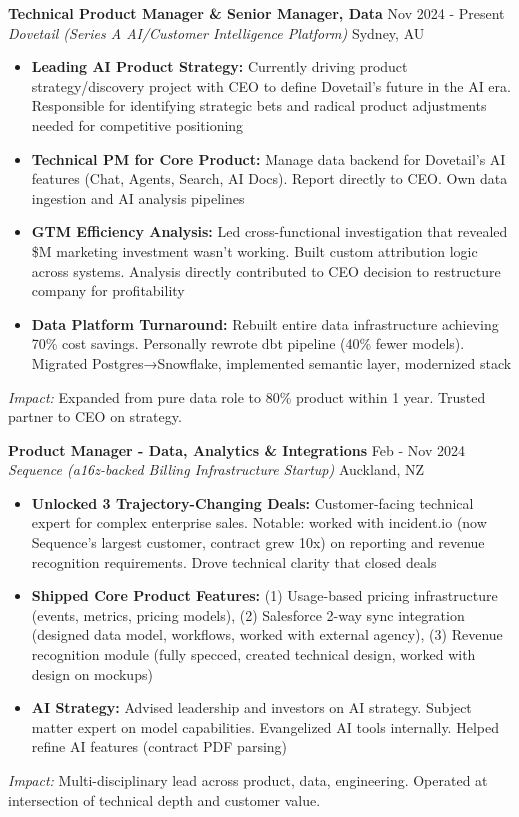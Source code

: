 \documentclass[10pt,a4paper]{article}
\newcommand{\cventry}[5]{
    \textbf{#1} \hfill {\small\color{darkgray} #2} \\
    {\color{accentcolor}\textit{#3}} \hfill {\small\color{darkgray} #4} \\
    #5
    \vspace{6pt}
}
\begin{document}
\cventry
    {Technical Product Manager \& Senior Manager, Data}
    {Nov 2024 - Present}
    {Dovetail (Series A AI/Customer Intelligence Platform)}
    {Sydney, AU}
    {
    \begin{itemize}[leftmargin=*, itemsep=1pt, parsep=0pt, topsep=2pt]
        \item \textbf{Leading AI Product Strategy:} Currently driving product strategy/discovery project with CEO to define Dovetail's future in the AI era. Responsible for identifying strategic bets and radical product adjustments needed for competitive positioning
        \item \textbf{Technical PM for Core Product:} Manage data backend for Dovetail's AI features (Chat, Agents, Search, AI Docs). Report directly to CEO. Own data ingestion and AI analysis pipelines
        \item \textbf{GTM Efficiency Analysis:} Led cross-functional investigation that revealed \$M marketing investment wasn't working. Built custom attribution logic across systems. Analysis directly contributed to CEO decision to restructure company for profitability
        \item \textbf{Data Platform Turnaround:} Rebuilt entire data infrastructure achieving 70\% cost savings. Personally rewrote dbt pipeline (40\% fewer models). Migrated Postgres→Snowflake, implemented semantic layer, modernized stack
    \end{itemize}
    \textit{Impact:} Expanded from pure data role to 80\% product within 1 year. Trusted partner to CEO on strategy.
    }

\cventry
    {Product Manager - Data, Analytics \& Integrations}
    {Feb - Nov 2024}
    {Sequence (a16z-backed Billing Infrastructure Startup)}
    {Auckland, NZ}
    {
    \begin{itemize}[leftmargin=*, itemsep=1pt, parsep=0pt, topsep=2pt]
        \item \textbf{Unlocked 3 Trajectory-Changing Deals:} Customer-facing technical expert for complex enterprise sales. Notable: worked with incident.io (now Sequence's largest customer, contract grew 10x) on reporting and revenue recognition requirements. Drove technical clarity that closed deals
        \item \textbf{Shipped Core Product Features:} (1) Usage-based pricing infrastructure (events, metrics, pricing models), (2) Salesforce 2-way sync integration (designed data model, workflows, worked with external agency), (3) Revenue recognition module (fully specced, created technical design, worked with design on mockups)
        \item \textbf{AI Strategy:} Advised leadership and investors on AI strategy. Subject matter expert on model capabilities. Evangelized AI tools internally. Helped refine AI features (contract PDF parsing)
    \end{itemize}
    \textit{Impact:} Multi-disciplinary lead across product, data, engineering. Operated at intersection of technical depth and customer value.
    }
\end{document}
